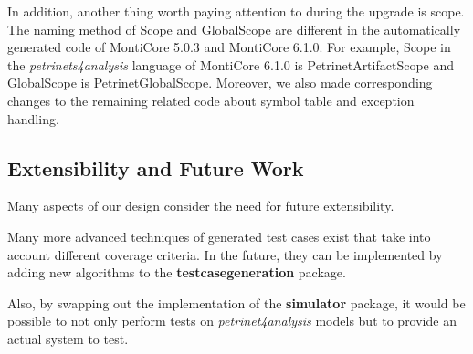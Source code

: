 In addition, another thing worth paying attention to during the upgrade is scope. The naming method of Scope and GlobalScope are different in the automatically generated code of MontiCore 5.0.3 and MontiCore 6.1.0. For example, Scope in the \emph{petrinets4analysis} language of MontiCore 6.1.0 is PetrinetArtifactScope and GlobalScope is PetrinetGlobalScope. Moreover, we also made corresponding changes to the remaining related code about symbol table and exception handling.


\subsection{Extensibility and Future Work}

Many aspects of our design consider the need for future extensibility. 

Many more advanced techniques of generated test cases exist that take into account different coverage criteria. In the future, they can be implemented by adding new algorithms to the \textbf{testcasegeneration} package.

Also, by swapping out the implementation of the \textbf{simulator} package, it would be possible to not only perform tests on \textit{petrinet4analysis} models but to provide an actual system to test.
